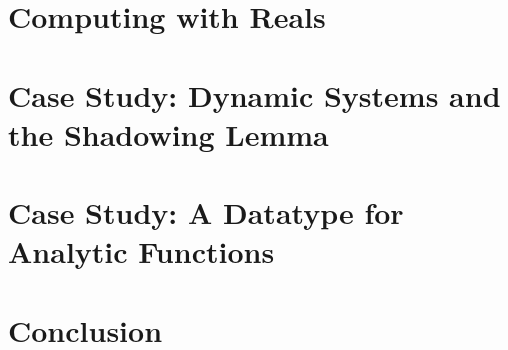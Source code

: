 \documentclass[tudarticle,type=msc,colorback,accentcolor=tud9c]{tudthesis}
\begin{document}
  \chapter{Computing with Reals}
  
  
  
  
  
  
  \chapter{Case Study: Dynamic Systems and the Shadowing Lemma}
  
  \chapter{Case Study: A Datatype for Analytic Functions}
  
  \chapter{Conclusion}
  
  
\end{document}
